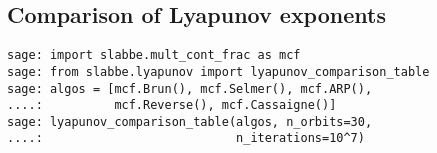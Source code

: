\subsection{Comparison of Lyapunov exponents}
\begin{verbatim}
sage: import slabbe.mult_cont_frac as mcf
sage: from slabbe.lyapunov import lyapunov_comparison_table
sage: algos = [mcf.Brun(), mcf.Selmer(), mcf.ARP(), 
....:          mcf.Reverse(), mcf.Cassaigne()]
sage: lyapunov_comparison_table(algos, n_orbits=30, 
....:                           n_iterations=10^7)
\end{verbatim}
